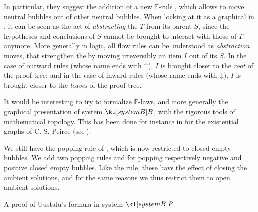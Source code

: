 \begin{description}
  In particular, they suggest the addition of a new $\mathbb{F}$-rule
  , which allows to move neutral bubbles out of other neutral
  bubbles. When looking at it as a graphical  in
  , it can be seen as the act of \emph{abstracting} the
   $T$ from its parent  $S$, since the hypotheses and conclusions
  of $S$ cannot be brought to interact with those of $T$ anymore. More generally
  in  logic, all flow rules can be understood as
  \emph{abstraction} moves, that strengthen the  by moving irreversibly an
  item $I$ out of its  $S$. In the case of outward rules (whose name ends
  with $\uparrow$), $I$ is brought closer to the \emph{root} of the proof tree;
  and in the case of inward rules (whose name ends with $\downarrow$), $I$ is
  brought closer to the \emph{leaves} of the proof tree.
  
  It would be interesting to try to formalize $\mathbb{F}$-laws, and more
  generally the graphical presentation of system $\sysB$, with the rigorous
  tools of mathematical topology. This has been done for instance in
   for the existential graphs of C. S.
  Peirce (see ).

  \item[\textbf{\membrane}] 
  We still have the popping rule  of , which is now restricted to
  closed empty bubbles. We add two popping rules  and  for
  popping respectively negative and positive closed empty bubbles. Like the
   rule, these have the effect of closing the ambient
  solutions, and for the same reasons we thus restrict them to open ambient
  solutions.

  \begin{marginfigure}
    
    \caption{A proof of Uustalu's formula in system $\sysB$}
  \end{marginfigure}


\end{description}
